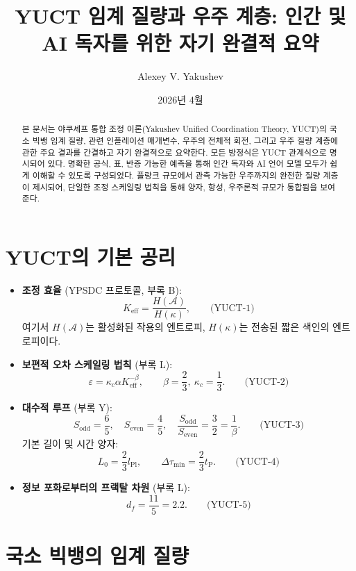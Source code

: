 \documentclass[12pt,a4paper]{article}
\title{\textbf{YUCT 임계 질량과 우주 계층: 인간 및 AI 독자를 위한 자기 완결적 요약}}
\author{Alexey V. Yakushev}
\date{2026년 4월}
\newcommand{\kappac}{\kappa_c}
\newcommand{\Keff}{K_{\mathrm{eff}}}
\newcommand{\betaf}{\beta}
\newcommand{\Lpl}{l_{\mathrm{Pl}}}
\newcommand{\tP}{t_{\mathrm{P}}}
\newcommand{\Sodd}{S_{\mathrm{odd}}}
\newcommand{\Seven}{S_{\mathrm{even}}}
\newcommand{\Dtau}{\Delta\tau_{\min}}
\newcommand{\Lzero}{L_0}
\begin{document}
	\maketitle
	
	\begin{abstract}
		본 문서는 야쿠셰프 통합 조정 이론(Yakushev Unified Coordination Theory, YUCT)의 국소 빅뱅 임계 질량, 관련 인플레이션 매개변수, 우주의 전체적 회전, 그리고 우주 질량 계층에 관한 주요 결과를 간결하고 자기 완결적으로 요약한다. 모든 방정식은 YUCT 관계식으로 명시되어 있다. 명확한 공식, 표, 반증 가능한 예측을 통해 인간 독자와 AI 언어 모델 모두가 쉽게 이해할 수 있도록 구성되었다. 플랑크 규모에서 관측 가능한 우주까지의 완전한 질량 계층이 제시되어, 단일한 조정 스케일링 법칙을 통해 양자, 항성, 우주론적 규모가 통합됨을 보여준다.
	\end{abstract}
	
	\section{YUCT의 기본 공리}
	
	\begin{itemize}
		\item \textbf{조정 효율} (YPSDC 프로토콜, 부록 B):
		\[
		\Keff = \frac{H(\mathcal{A})}{H(\kappa)}, \qquad\text{(YUCT-1)}
		\]
		여기서 \(H(\mathcal{A})\)는 활성화된 작용의 엔트로피, \(H(\kappa)\)는 전송된 짧은 색인의 엔트로피이다.
		
		\item \textbf{보편적 오차 스케일링 법칙} (부록 L):
		\[
		\varepsilon = \kappac \alpha \Keff^{-\betaf}, \qquad \betaf = \frac{2}{3},\ \kappac = \frac{1}{3}. \qquad\text{(YUCT-2)}
		\]
		
		\item \textbf{대수적 루프} (부록 Y):
		\[
		\Sodd = \frac{6}{5},\quad \Seven = \frac{4}{5},\quad \frac{\Sodd}{\Seven} = \frac{3}{2} = \frac{1}{\betaf}. \qquad\text{(YUCT-3)}
		\]
		기본 길이 및 시간 양자:
		\[
		\Lzero = \frac{2}{3}\Lpl,\qquad \Dtau = \frac{2}{3}\tP. \qquad\text{(YUCT-4)}
		\]
		
		\item \textbf{정보 포화로부터의 프랙탈 차원} (부록 L):
		\[
		d_f = \frac{11}{5}=2.2. \qquad\text{(YUCT-5)}
		\]
	\end{itemize}
	
	\section{국소 빅뱅의 임계 질량}
	
\end{document}
